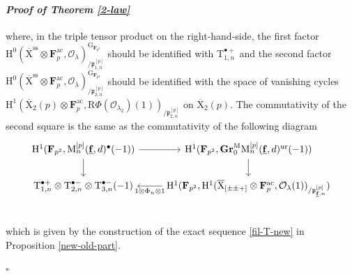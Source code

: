\documentclass[10pt]{amsart}
\numberwithin{equation}{section}
\theoremstyle{plain}
\numberwithin{equation}{section}
\theoremstyle{definition}
\theoremstyle{remark}
\newenvironment{myproof}[2] {\paragraph{\emph{Proof of {#1} {#2} }}}{\hfill$\square$}
\def\ac{\mathrm{ac}}
\def\ss{\mathrm{ss}}
\def\ur{\mathrm{ur}}
\def\ac{\mathrm{ac}}
\def\triplef{\underline{\mathbf{f}}}
\def\calO{\mathcal{O}}
\def\frakp{\mathfrak{p}}
\def\FF{\mathbf{F}}
\def\rmG{\mathrm{G}}
\def\rmH{\mathrm{H}}
\def\rmM{\mathrm{M}}
\def\rmX{\mathrm{X}}
\def\rmXbar{\overline{\rmX}}
\def\rmR{\mathrm{R}}
\def\rmT{\mathrm{T}}
\newcommand{\Gr}{\mathbf{Gr}}
\begin{document}
\begin{myproof}{Theorem \ref{2-law}}{}
\begin{equation*}
\end{equation*}
where, in the triple tensor product on the right-hand-side, the first factor $\rmH^{0}(\rmXbar^{\ss}\otimes\FF^{\ac}_{p},\calO_{\lambda})^{\rmG_{\FF_{p^{2}}}}_{/\frakp^{[p]}_{1, n}}$ should be identified with $\rmT^{\bullet+}_{1, n}$ and the second factor $\rmH^{0}(\rmXbar^{\ss}\otimes\FF^{\ac}_{p},\calO_{\lambda})^{\rmG_{\FF_{p^{2}}}}_{/\frakp^{[p]}_{2, n}}$ should be identified with the space of vanishing cycles $\rmH^{1}(\overline{\rmX}_{2}(p)\otimes{\FF^{\ac}_{p}}, \rmR\Phi(\calO_{\lambda_{2}})(1))_{/\frakp^{[p]}_{2, n}}$ on $\overline{\rmX}_{2}(p)$.
The commutativity of the second square is the same as the commutativity of the following diagram
\begin{equation}
\begin{tikzcd}
\rmH^{1}(\FF_{p^{2}}, \rmM^{[p]}_{n}(\triplef, d)^{\bullet}(-1))\arrow[r]\arrow[d]&\rmH^{1}(\FF_{p^{2}}, \Gr^{\rmM}_{0}\rmM^{[p]}_{n}(\triplef,d)^{\ur}(-1)) \arrow[d] \\
\rmT^{\bullet+}_{1, n}\otimes\rmT^{\bullet-}_{2, n}\otimes \rmT^{\bullet-}_{3, n}(-1)   & \rmH^{1}(\FF_{p^{2}}, \rmH^{1}(\rmXbar_{[\pm\pm+]}\otimes{\FF^{\ac}_{p}}, \calO_{\lambda}(1))_{/\frakp^{[p]}_{\triplef, n}}) \arrow[l, "1\otimes\Phi_{n}\otimes1" ] \\
\end{tikzcd}
\end{equation}
which is given by the construction of the exact sequence \ref{fil-T-new} in Proposition \ref{new-old-part}.
 

\end{myproof}
\end{document}
